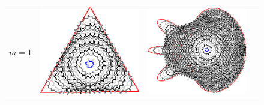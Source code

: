 {\begin{figure}
\center
\begin{tabular}{p{3em}ccc}
$m=1$ & \includegraphics[scale=0.25]{figures/chapter6/level-effect/triangle/improve/len_pen0/radius-5/level1/summary.pdf} &
\includegraphics[scale=0.25]{figures/chapter6/level-effect/flower/improve/len_pen0/radius-5/level1/summary.pdf} &

\end{tabular}
\end{figure}}
